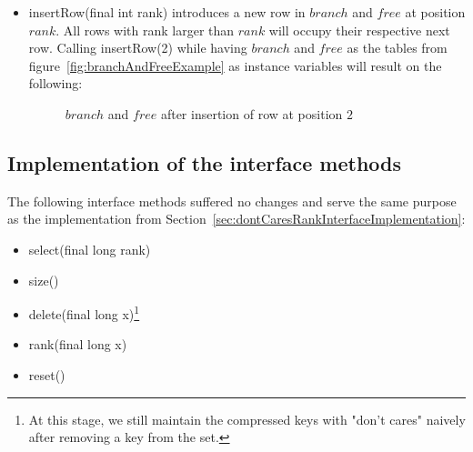\begin{itemize}
    \item
    {\ttfamily insertRow(final int rank)} introduces a new row in $branch$ and $free$ at position $rank$. All rows with rank larger than $rank$ will occupy their respective next row. Calling {\ttfamily insertRow(2)} while having $branch$ and $free$ as the tables from figure~\ref{fig:branchAndFreeExample} as instance variables will result on the following:
    \begin{figure}[H]
    \centering
    
    \caption{$branch$ and $free$ after insertion of row at position $2$}
    \label{fig:branchAndFreeAfterRowInsertion}
    \end{figure}
\end{itemize}

\subsection{Implementation of the interface methods}  \label{sec:dontCaresInsertInterfaceImplementation}

The following interface methods suffered no changes and serve the same purpose as the implementation from Section~\ref{sec:dontCaresRankInterfaceImplementation}:
\begin{itemize}
    \item
    {\ttfamily select(final long rank)}
    
    \item
    {\ttfamily size()}
    
    \item
    {\ttfamily delete(final long x)}\footnote{At this stage, we still maintain the compressed keys with "don't cares" naively after removing a key from the set.}
    
    \item
    {\ttfamily rank(final long x)}
    
    \item
    {\ttfamily reset()}
\end{itemize}

